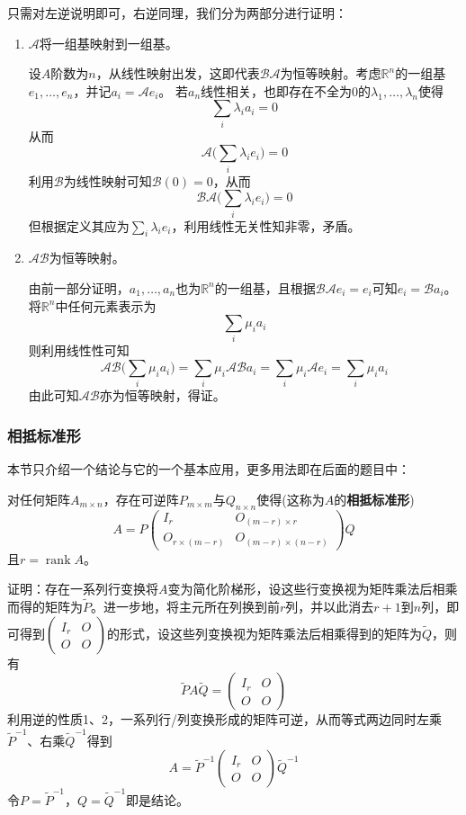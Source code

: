 \documentclass[a4paper,UTF8,fontset=windows]{ctexart}
\DeclareMathOperator{\rank}{rank}
\newcommand*{\ma}{\mathcal{A}}
\newcommand*{\mb}{\mathcal{B}}
\begin{document}
只需对左逆说明即可，右逆同理，我们分为两部分进行证明：
\begin{enumerate}
    \item $\ma$将一组基映射到一组基。
    
    设$A$阶数为$n$，从线性映射出发，这即代表$\mb\ma$为恒等映射。考虑$\mathbb{R}^n$的一组基$e_1,\dots,e_n$，并记$a_i=\ma e_i$。
    若$a_n$线性相关，也即存在不全为0的$\lambda_1,\dots,\lambda_n$使得
    $$\sum_i\lambda_ia_i=0$$
    从而
    $$\ma\bigg(\sum_i\lambda_ie_i\bigg)=0$$
    利用$\mb$为线性映射可知$\mb(0)=0$，从而
    $$\mb\ma\bigg(\sum_i\lambda_ie_i\bigg)=0$$
    但根据定义其应为$\sum_i\lambda_ie_i$，利用线性无关性知非零，矛盾。

    \item $\ma\mb$为恒等映射。
    
    由前一部分证明，$a_1,\dots,a_n$也为$\mathbb{R}^n$的一组基，且根据$\mb\ma e_i=e_i$可知$e_i=\mb a_i$。
    将$\mathbb{R}^n$中任何元素表示为
    $$\sum_i\mu_ia_i$$
    则利用线性性可知
    $$\ma\mb\bigg(\sum_i\mu_ia_i\bigg)=\sum_i\mu_i\ma\mb a_i=\sum_i\mu_i\ma e_i=\sum_i\mu_ia_i$$
    由此可知$\ma\mb$亦为恒等映射，得证。
\end{enumerate}

\subsubsection{相抵标准形}
本节只介绍一个结论与它的一个基本应用，更多用法即在后面的题目中：

对任何矩阵$A_{m\times n}$，存在可逆阵$P_{m\times m}$与$Q_{n\times n}$使得(这称为$A$的\textbf{相抵标准形})
$$A=P\begin{pmatrix}I_r&O_{(m-r)\times r}\\O_{r\times(m-r)}&O_{(m-r)\times(n-r)}\end{pmatrix}Q$$
且$r=\rank A$。

证明：存在一系列行变换将$A$变为简化阶梯形，设这些行变换视为矩阵乘法后相乘而得的矩阵为$\tilde{P}$。进一步地，将主元所在列换到前$r$列，并以此消去$r+1$到$n$列，即可得到$\begin{pmatrix}I_r&O\\O&O\end{pmatrix}$的形式，设这些列变换视为矩阵乘法后相乘得到的矩阵为$\tilde{Q}$，则有
$$\tilde{P}A\tilde{Q}=\begin{pmatrix}I_r&O\\O&O\end{pmatrix}$$
利用逆的性质1、2，一系列行/列变换形成的矩阵可逆，从而等式两边同时左乘$\tilde{P}^{-1}$、右乘$\tilde{Q}^{-1}$得到
$$A=\tilde{P}^{-1}\begin{pmatrix}I_r&O\\O&O\end{pmatrix}\tilde{Q}^{-1}$$
令$P=\tilde{P}^{-1}$，$Q=\tilde{Q}^{-1}$即是结论。
\end{document}
